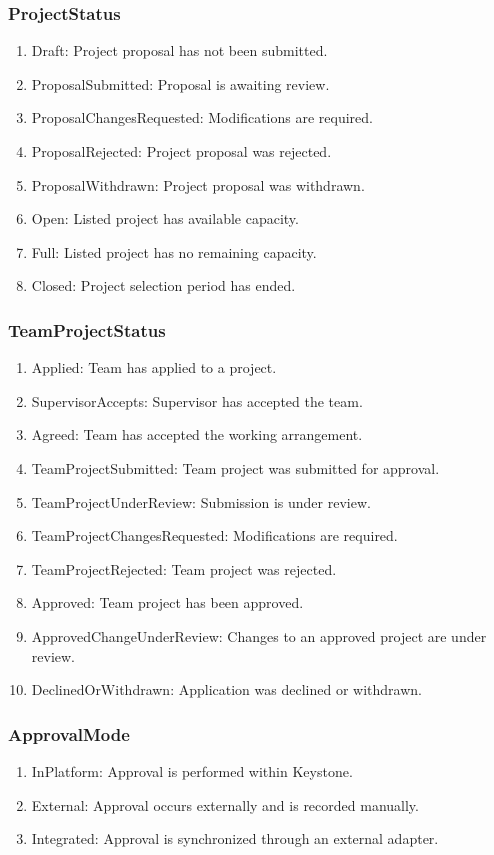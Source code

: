 \documentclass[12pt, titlepage]{article}
\begin{document}
\subsubsection{ProjectStatus}
\begin{enumerate}
    \item Draft: Project proposal has not been submitted.
    \item ProposalSubmitted: Proposal is awaiting review.
    \item ProposalChangesRequested: Modifications are required.
    \item ProposalRejected: Project proposal was rejected.
    \item ProposalWithdrawn: Project proposal was withdrawn.
    \item Open: Listed project has available capacity.
    \item Full: Listed project has no remaining capacity.
    \item Closed: Project selection period has ended.
\end{enumerate}

\subsubsection{TeamProjectStatus}
\begin{enumerate}
    \item Applied: Team has applied to a project.
    \item SupervisorAccepts: Supervisor has accepted the team.
    \item Agreed: Team has accepted the working arrangement.
    \item TeamProjectSubmitted: Team project was submitted for approval.
    \item TeamProjectUnderReview: Submission is under review.
    \item TeamProjectChangesRequested: Modifications are required.
    \item TeamProjectRejected: Team project was rejected.
    \item Approved: Team project has been approved.
    \item ApprovedChangeUnderReview: Changes to an approved
    project are under review.
    \item DeclinedOrWithdrawn: Application was declined or withdrawn.
\end{enumerate}

\subsubsection{ApprovalMode}
\begin{enumerate}
    \item InPlatform: Approval is performed within Keystone.
    \item External: Approval occurs externally and is recorded manually.
    \item Integrated: Approval is synchronized through an external adapter.
\end{enumerate}
\end{document}
